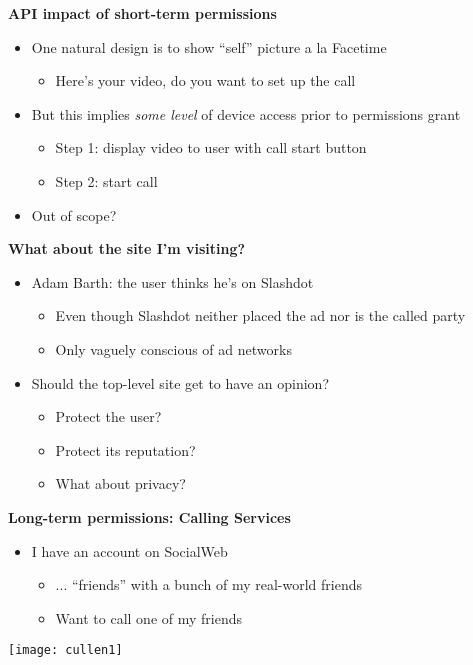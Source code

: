 \documentclass[helvetica]{seminar}
\newcommand{\heading}[1]{%
  \begin{center} 
    \large\bf 
    #1 
  \end{center} 
  \vspace{.4 in}}
\begin{document}
\begin{slide}
\heading{API impact of short-term permissions}

\begin{itemize}
\item One natural design is to show ``self'' picture a la Facetime
  \begin{itemize}
  \item Here's your video, do you want to set up the call
  \end{itemize}

\item But this implies \emph{some level} of device access prior to permissions grant
  \begin{itemize}
  \item Step 1: display video to user with call start button
  \item Step 2: start call
  \end{itemize}

\item Out of scope?
\end{itemize}
\end{slide}



\begin{slide}
\heading{What about the site I'm visiting?}

\begin{itemize}
\item Adam Barth: the user thinks he's on Slashdot
  \begin{itemize}
  \item Even though Slashdot neither placed the ad nor is the called party
  \item Only vaguely conscious of ad networks
  \end{itemize}

\item Should the top-level site get to have an opinion?
  \begin{itemize}
  \item Protect the user?
  \item Protect its reputation?
  \item What about privacy?
  \end{itemize}
\end{itemize}

\end{slide}


\begin{slide}
\heading{Long-term permissions: Calling Services}

\begin{itemize}
\item I have an account on SocialWeb
\begin{itemize}
\item ... ``friends'' with a bunch of my real-world friends
\item Want to call one of my friends
\end{itemize}
\end{itemize}

\texttt{[image: cullen1]}
\end{slide}
\end{document}
